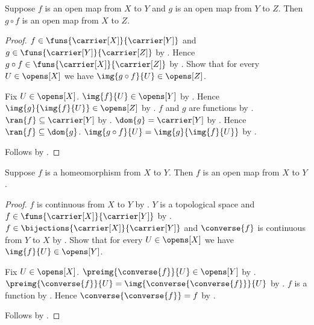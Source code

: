 \begin{theorem}\label{open_map_composition}
    Suppose $f$ is an open map from $X$ to $Y$ and
        $g$ is an open map from $Y$ to $Z$.
    Then $g\circ f$ is an open map from $X$ to $Z$.
\end{theorem}
\begin{proof}
    $f\in\funs{\carrier[X]}{\carrier[Y]}$ and
        $g\in\funs{\carrier[Y]}{\carrier[Z]}$ by
        .
    Hence $g\circ f\in\funs{\carrier[X]}{\carrier[Z]}$ by
        .
    Show that for every $U\in\opens[X]$ we have
        $\img{g\circ f}{U}\in\opens[Z]$.
    \begin{subproof}
        Fix $U\in\opens[X]$.
        $\img{f}{U}\in\opens[Y]$ by .
        Hence $\img{g}{\img{f}{U}}\in\opens[Z]$ by
            .
        $f$ and $g$ are functions by .
        $\ran{f}\subseteq\carrier[Y]$ by .
        $\dom{g}=\carrier[Y]$ by .
        Hence $\ran{f}\subseteq\dom{g}$.
        $\img{g\circ f}{U}=\img{g}{\img{f}{U}}$ by
            .
    \end{subproof}
    Follows by .
\end{proof}

\begin{classification}\label{homeomorphism_is_open_map}
    Suppose $f$ is a homeomorphism from $X$ to $Y$.
    Then $f$ is an open map from $X$ to $Y$.
\end{classification}
\begin{proof}
    $f$ is continuous from $X$ to $Y$ by .
    $Y$ is a topological space and
        $f\in\funs{\carrier[X]}{\carrier[Y]}$ by
        .
    $f\in\bijections{\carrier[X]}{\carrier[Y]}$ and
        $\converse{f}$ is continuous from $Y$ to $X$ by
        .
    Show that for every $U\in\opens[X]$ we have
        $\img{f}{U}\in\opens[Y]$.
    \begin{subproof}
        Fix $U\in\opens[X]$.
        $\preimg{\converse{f}}{U}\in\opens[Y]$ by
            .
        $\preimg{\converse{f}}{U}
            =\img{\converse{\converse{f}}}{U}$ by
            .
        $f$ is a function by .
        Hence $\converse{\converse{f}}=f$ by
            .
    \end{subproof}
    Follows by .
\end{proof}

